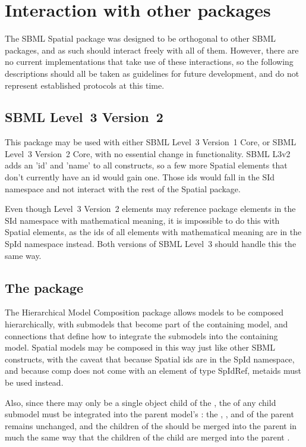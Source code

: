 \section{Interaction with other packages}
\begin{blockChanged}
The SBML Spatial package was designed to be orthogonal to other SBML packages, and as such should interact freely with all of them.  However, there are no current implementations that take use of these interactions, so the following descriptions should all be taken as guidelines for future development, and do not represent established protocols at this time.

\subsection{SBML Level~3 Version~2}
This package may be used with either SBML Level~3 Version~1 Core, or SBML Level~3 Version~2 Core, with no essential change in functionality.  SBML L3v2 adds an 'id' and 'name' to all constructs, so a few more Spatial elements that don't currently have an id would gain one.  Those ids would fall in the SId namespace and not interact with the rest of the Spatial package.

Even though Level~3 Version~2 elements may reference package elements in the SId namespace with mathematical meaning, it is impossible to do this with Spatial elements, as the ids of all elements with mathematical meaning are in the SpId namespace instead.  Both versions of SBML Level~3 should handle this the same way.


\subsection{The  package}
The Hierarchical Model Composition package allows models to be composed hierarchically, with submodels that become part of the containing model, and connections that define how to integrate the submodels into the containing model.  Spatial models may be composed in this way just like other SBML constructs, with the caveat that because Spatial ids are in the SpId namespace, and because comp does not come with an element of type SpIdRef, metaids must be used instead.

Also, since there may only be a single \Geometry object child of the \Model, the \Geometry of any child submodel must be integrated into the parent model's \Geometry:  the , , and  of the parent remains unchanged, and the children of the \Geometry should be merged into the parent \Geometry in much the same way that the children of the child \Model are merged into the parent \Model.



\end{blockChanged}

